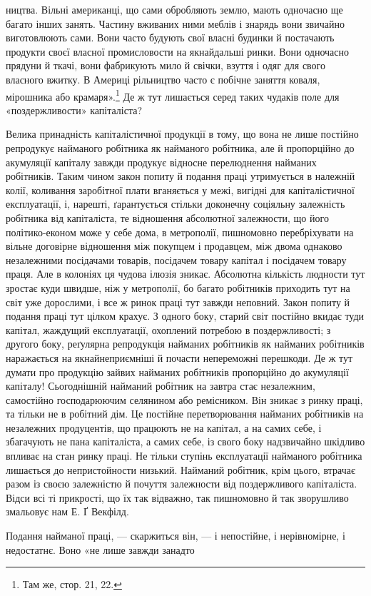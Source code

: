 ництва. Вільні американці, що сами обробляють землю, мають одночасно ще багато інших занять. Частину
вживаних ними меблів і знарядь вони звичайно виготовлюють сами. Вони часто будують свої власні
будинки й постачають продукти своєї власної
промисловости на якнайдальші ринки. Вони одночасно прядуни й ткачі, вони фабрикують мило й свічки,
взуття і одяг для свого власного вжитку. В Америці рільництво часто є побічне заняття коваля,
мірошника або крамаря».\footnote{
Там же, стор. 21, 22.
} Де ж тут лишається серед таких чудаків поле для «поздержливости»
капіталіста?

Велика принадність капіталістичної продукції в тому, що вона не лише постійно репродукує найманого
робітника як найманого робітника, але й пропорційно до акумуляції капіталу завжди продукує відносне
перелюднення найманих робітників.
Таким чином закон попиту й подання праці утримується в належній колії, коливання заробітної плати
вганяється у межі, вигідні для капіталістичної експлуатації, і, нарешті, ґарантується стільки
доконечну соціяльну залежність робітника від
капіталіста, те відношення абсолютної залежности, що його політико-економ може у себе дома, в
метрополії, пишномовно перебріхувати на вільне договірне відношення між покупцем і продавцем, між
двома однаково незалежними посідачами товарів,
посідачем товару капітал і посідачем товару праця. Але в колоніях ця чудова ілюзія зникає. Абсолютна
кількість людности тут зростає куди швидше, ніж у метрополії, бо багато робітників приходить тут на
світ уже дорослими, і все ж ринок праці тут завжди неповний. Закон попиту й подання праці тут цілком
крахує. З одного боку, старий світ постійно вкидає туди капітал, жаждущий експлуатації, охоплений
потребою в
поздержливості; з другого боку, реґулярна репродукція найманих робітників як найманих робітників
наражається на якнайнеприємніші й почасти непереможні перешкоди. Де ж тут думати про продукцію
зайвих найманих робітників пропорційно
до акумуляції капіталу! Сьогоднішній найманий робітник на завтра стає незалежним, самостійно
господарюючим селянином або ремісником. Він зникає з ринку праці, та тільки не в робітний дім. Це
постійне перетворювання найманих робітників на незалежних продуцентів, що працюють не на капітал, а
на самих себе, і збагачують не пана капіталіста, а самих себе, із свого боку надзвичайно шкідливо
впливає на стан
ринку праці. Не тільки ступінь експлуатації найманого робітника лишається до непристойности низький.
Найманий робітник, крім цього, втрачає разом із своєю залежністю й почуття залежности від
поздержливого капіталіста. Відси всі ті прикрості,
що їх так відважно, так пишномовно й так зворушливо змальовує нам Е. Ґ Векфілд.

Подання найманої праці, — скаржиться він, — і непостійне, і нерівномірне, і недостатнє. Воно «не
лише завжди занадто